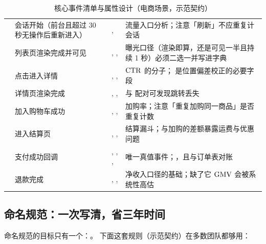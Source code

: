 \begin{table}[htbp]
\centering
\caption{核心事件清单与属性设计（电商场景，示范契约）}
\label{tab:growth-events}
\small
\begin{tabularx}{\textwidth}{L{2.6cm} L{2.5cm} L{3.4cm} Y}
\toprule
{} &  &  &  \\
\midrule
{} & 会话开始（前台且超过 30 秒无操作后重新进入） & ,  & 流量入口分析；注意「刷新」不应重复计会话 \\
\addlinespace
{} & 列表页渲染完成并可见 & , ,  & 曝光口径（渲染即算，还是可见一半且持续 1 秒）必须二选一并写进字典 \\
\addlinespace
{} & 点击进入详情 & , ,  & $\operatorname{CTR}$ 的分子； 是位置偏差校正的必要字段 \\
\addlinespace
{} & 详情页渲染完成 & , ,  & 与  配对可发现跳转丢失 \\
\addlinespace
{} & 加入购物车成功 & , ,  & 加购率；注意「重复加购同一商品」是否重复计数 \\
\addlinespace
{} & 进入结算页 & , ,  & 结算漏斗；与加购的差额暴露运费与优惠问题 \\
\addlinespace
{} & 支付成功回调 & , , ,  & 唯一真值事件；，且与订单表对账 \\
\addlinespace
{} & 退款完成 & , ,  & 净收入口径的基础；缺了它 $\operatorname{GMV}$ 会被系统性高估 \\
\bottomrule
\end{tabularx}
\end{table}

\subsection{命名规范：一次写清，省三年时间}

命名规范的目标只有一个：。
下面这套规则（示范契约）在多数团队都够用：

